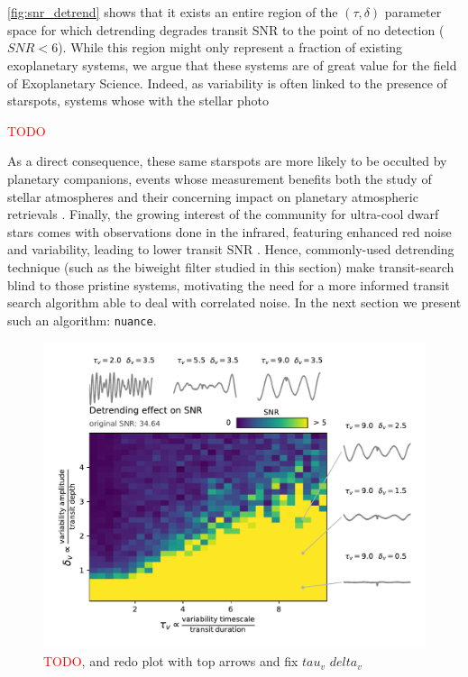 \documentclass{aastex631}
\newcommand{\TODO}{\textcolor{red}{TODO}}
\begin{document}
\\\\
\autoref{fig:snr_detrend} shows that it exists an entire region of the $(\tau, \delta)$ parameter space for which detrending degrades transit SNR to the point of no detection ($SNR < 6$). While this region might only represent a fraction of existing exoplanetary systems, we argue that these systems are of great value for the field of Exoplanetary Science. Indeed, as variability is often linked to the presence of starspots, systems whose  with the stellar photo 


\TODO

As a direct consequence, these same starspots are more likely to be occulted by planetary companions, events whose measurement benefits both the study of stellar atmospheres and their concerning impact on planetary atmospheric retrievals \cite{}. Finally, the growing interest of the community for ultra-cool dwarf stars comes with observations done in the infrared, featuring enhanced red noise and variability, leading to lower transit SNR \cite{}. Hence, commonly-used detrending technique (such as the biweight filter studied in this section) make transit-search blind to those pristine systems, motivating the need for a more informed transit search algorithm able to deal with correlated noise. In the next section we present such an algorithm: \texttt{nuance}.

\begin{figure}[H]
    \begin{centering}
        \includegraphics[height=9cm]{../../workflows/cleaning_snr/figures/simu1/result.pdf}
        \caption{\TODO{}, and redo plot with top arrows and fix $tau_v$ $delta_v$}
        \label{fig:snr_detrend}
    \end{centering}
\end{figure}
\end{document}
